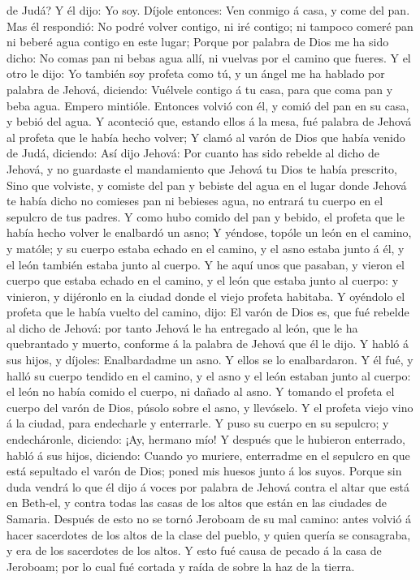 de Judá? Y él dijo: Yo soy.  Díjole entonces: Ven conmigo á
casa, y come del pan.  Mas él respondió: No podré volver
contigo, ni iré contigo; ni tampoco comeré pan ni beberé agua contigo en
este lugar;  Porque por palabra de Dios me ha sido dicho:
No comas pan ni bebas agua allí, ni vuelvas por el camino que fueres.
 Y el otro le dijo: Yo también soy profeta como tú, y un
ángel me ha hablado por palabra de Jehová, diciendo: Vuélvele contigo á
tu casa, para que coma pan y beba agua. Empero mintióle. 
Entonces volvió con él, y comió del pan en su casa, y bebió del agua.
 Y aconteció que, estando ellos á la mesa, fué palabra de
Jehová al profeta que le había hecho volver;  Y clamó al
varón de Dios que había venido de Judá, diciendo: Así dijo Jehová: Por
cuanto has sido rebelde al dicho de Jehová, y no guardaste el
mandamiento que Jehová tu Dios te había prescrito,  Sino
que volviste, y comiste del pan y bebiste del agua en el lugar donde
Jehová te había dicho no comieses pan ni bebieses agua, no entrará tu
cuerpo en el sepulcro de tus padres.  Y como hubo comido
del pan y bebido, el profeta que le había hecho volver le enalbardó un
asno;  Y yéndose, topóle un león en el camino, y matóle; y
su cuerpo estaba echado en el camino, y el asno estaba junto á él, y el
león también estaba junto al cuerpo.  Y he aquí unos que
pasaban, y vieron el cuerpo que estaba echado en el camino, y el león
que estaba junto al cuerpo: y vinieron, y dijéronlo en la ciudad donde
el viejo profeta habitaba.  Y oyéndolo el profeta que le
había vuelto del camino, dijo: El varón de Dios es, que fué rebelde al
dicho de Jehová: por tanto Jehová le ha entregado al león, que le ha
quebrantado y muerto, conforme á la palabra de Jehová que él le dijo.
 Y habló á sus hijos, y díjoles: Enalbardadme un asno. Y
ellos se lo enalbardaron.  Y él fué, y halló su cuerpo
tendido en el camino, y el asno y el león estaban junto al cuerpo: el
león no había comido el cuerpo, ni dañado al asno.  Y
tomando el profeta el cuerpo del varón de Dios, púsolo sobre el asno, y
llevóselo. Y el profeta viejo vino á la ciudad, para endecharle y
enterrarle.  Y puso su cuerpo en su sepulcro; y
endecháronle, diciendo: ¡Ay, hermano mío!  Y después que le
hubieron enterrado, habló á sus hijos, diciendo: Cuando yo muriere,
enterradme en el sepulcro en que está sepultado el varón de Dios; poned
mis huesos junto á los suyos.  Porque sin duda vendrá lo
que él dijo á voces por palabra de Jehová contra el altar que está en
Beth-el, y contra todas las casas de los altos que están en las ciudades
de Samaria.  Después de esto no se tornó Jeroboam de su mal
camino: antes volvió á hacer sacerdotes de los altos de la clase del
pueblo, y quien quería se consagraba, y era de los sacerdotes de los
altos.  Y esto fué causa de pecado á la casa de Jeroboam;
por lo cual fué cortada y raída de sobre la haz de la tierra.

